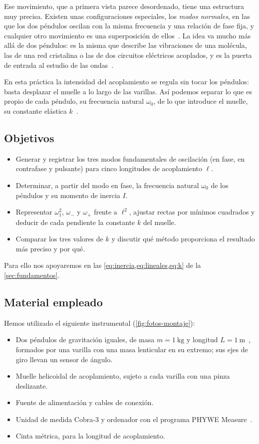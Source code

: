 \documentclass[a4paper,11pt]{amsart}
\numberwithin{equation}{section}
\newcommand{\wz}{\omega_0}                    %
\newcommand{\wu}{\omega_1}                    %
\newcommand{\wm}{\omega_{-}}                  %
\newcommand{\wpl}{\omega_{+}}                 %
\theoremstyle{cienplano}
\theoremstyle{ciendef}
\theoremstyle{cienobs}
\begin{document}
Ese movimiento, que a primera vista parece desordenado, tiene una estructura
muy precisa. Existen unas configuraciones especiales, los \emph{modos
normales}, en las que los dos péndulos oscilan con la misma frecuencia y una
relación de fase fija, y cualquier otro movimiento es una superposición de
ellos~\cite{FIV,FRENCH}. La idea va mucho más allá de dos péndulos: es la
misma que describe las vibraciones de una molécula, las de una red cristalina
o las de dos circuitos eléctricos acoplados, y es la puerta de entrada al
estudio de las ondas~\cite{FIV,CRAWFORD}.

En esta práctica la intensidad del acoplamiento se regula sin tocar los
péndulos: basta desplazar el muelle a lo largo de las varillas. Así podemos
separar lo que es propio de cada péndulo, su frecuencia natural $\wz$, de lo
que introduce el muelle, su constante elástica $k$~\cite{GUION-P3}.

\subsection{Objetivos}\label{sec:objetivos}
\begin{itemize}
  \item Generar y registrar los tres modos fundamentales de oscilación (en
        fase, en contrafase y pulsante) para cinco longitudes de
        acoplamiento $\ell$.
  \item Determinar, a partir del modo en fase, la frecuencia natural $\wz$
        de los péndulos y su momento de inercia $I$.
  \item Representar $\wu^{2}$, $\wm$ y $\wpl$ frente a $\ell^{2}$, ajustar
        rectas por mínimos cuadrados y deducir de cada pendiente la
        constante $k$ del muelle.
  \item Comparar los tres valores de $k$ y discutir qué método proporciona el
        resultado más preciso y por qué.
\end{itemize}
Para ello nos apoyaremos en las \cref{eq:inercia,eq:lineales,eq:k} de la
\cref{sec:fundamentos}.

\subsection{Material empleado}\label{sec:material}
Hemos utilizado el siguiente instrumental (\cref{fig:fotos-montaje}):
\begin{itemize}
  \item Dos péndulos de gravitación iguales, de masa $m=\SI{1}{\kilogram}$ y
        longitud $L=\SI{1}{\meter}$~\cite{GUION-P3}, formados por una varilla
        con una masa lenticular en su extremo; sus ejes de giro llevan un
        sensor de ángulo.
  \item Muelle helicoidal de acoplamiento, sujeto a cada varilla con una
        pinza deslizante.
  \item Fuente de alimentación y cables de conexión.
  \item Unidad de medida Cobra-3 y ordenador con el programa PHYWE
        Measure~\cite{PHYWE}.
  \item Cinta métrica, para la longitud de acoplamiento.
\end{itemize}
\end{document}

